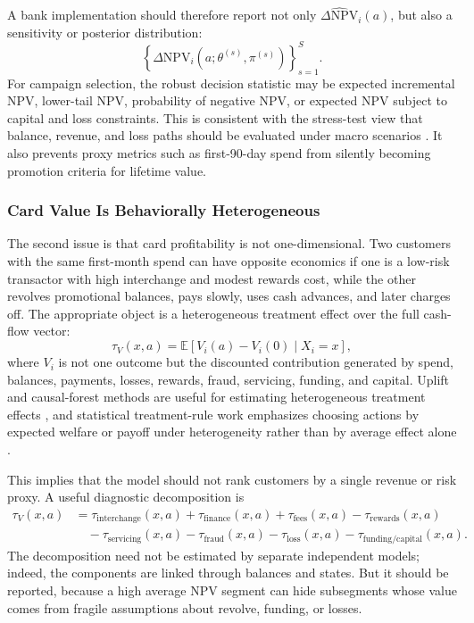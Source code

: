 \documentclass[11pt]{article}
\newcommand{\E}{\mathbb{E}}
\newcommand{\NPV}{\mathrm{NPV}}
\newcommand{\1}{\mathbf{1}}
\begin{document}
A bank implementation should therefore report not only
$\widehat{\Delta \NPV}_i(a)$, but also a sensitivity or posterior distribution:
\begin{equation}
  \left\{
    \Delta \NPV_i(a;\theta^{(s)},\pi^{(s)})
  \right\}_{s=1}^{S}.
  \label{eq:npv-sensitivity-draws}
\end{equation}
For campaign selection, the robust decision statistic may be expected
incremental NPV, lower-tail NPV, probability of negative NPV, or expected NPV
subject to capital and loss constraints. This is consistent with the stress-test
view that balance, revenue, and loss paths should be evaluated under macro
scenarios \citep{federalreserve2025stressmethodology,federalreserve2026stressmethodology}.
It also prevents proxy metrics such as first-90-day spend from silently becoming
promotion criteria for lifetime value.

\subsubsection{Card Value Is Behaviorally Heterogeneous}
\label{subsec:behavioral-heterogeneity}

The second issue is that card profitability is not one-dimensional. Two
customers with the same first-month spend can have opposite economics if one is
a low-risk transactor with high interchange and modest rewards cost, while the
other revolves promotional balances, pays slowly, uses cash advances, and later
charges off. The appropriate object is a heterogeneous treatment effect over
the full cash-flow vector:
\begin{equation}
  \tau_{V}(x,a)
  =
  \E[V_i(a)-V_i(0)\mid X_i=x],
  \label{eq:value-cate}
\end{equation}
where $V_i$ is not one outcome but the discounted contribution generated by
spend, balances, payments, losses, rewards, fraud, servicing, funding, and
capital. Uplift and causal-forest methods are useful for estimating
heterogeneous treatment effects \citep{lo2002true,wager2018causalforests,chernozhukov2018dml},
and statistical treatment-rule work emphasizes choosing actions by expected
welfare or payoff under heterogeneity rather than by average effect alone
\citep{manski2004treatment}.

This implies that the model should not rank customers by a single revenue or
risk proxy. A useful diagnostic decomposition is
\begin{align}
  \tau_{V}(x,a)
  &=
  \tau_{\mathrm{interchange}}(x,a)
  + \tau_{\mathrm{finance}}(x,a)
  + \tau_{\mathrm{fees}}(x,a)
  - \tau_{\mathrm{rewards}}(x,a) \nonumber\\
  &\quad
  - \tau_{\mathrm{servicing}}(x,a)
  - \tau_{\mathrm{fraud}}(x,a)
  - \tau_{\mathrm{loss}}(x,a)
  - \tau_{\mathrm{funding/capital}}(x,a).
  \label{eq:value-cate-decomposition}
\end{align}
The decomposition need not be estimated by separate independent models; indeed,
the components are linked through balances and states. But it should be
reported, because a high average NPV segment can hide subsegments whose value
comes from fragile assumptions about revolve, funding, or losses.
\end{document}
